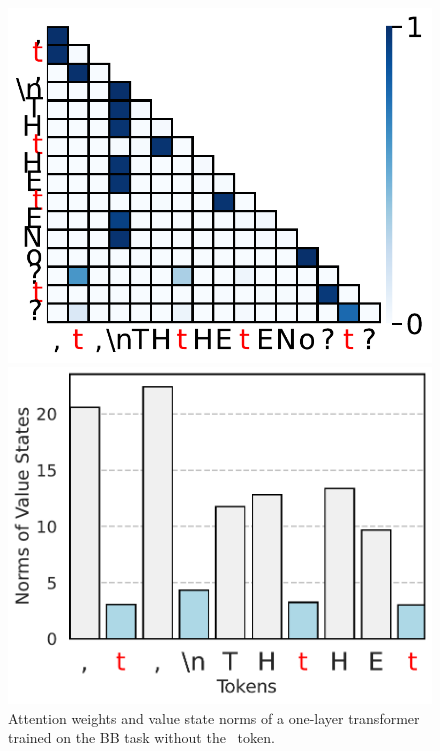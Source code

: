\begin{figure}[t]
  \centering
  \begin{minipage}{0.35\textwidth}
      \centering
      \vspace{-.2em}
      \includegraphics[width=\linewidth]{Figures/BBM_appendix/no_bos_attn_fig0.pdf}
  \end{minipage}
  \begin{minipage}{0.35\textwidth}
      \centering
      \vspace{-.2em}
      \includegraphics[width=\linewidth]{Figures/BBM_appendix/no_bos_value_states_layer_0.pdf}
  \end{minipage}
\caption{\small Attention weights and value state norms of a one-layer transformer trained on the BB task without the \bos~token.}
  \label{appfigure:no-bos-extreme}
  \vspace{-1em}
\end{figure}


